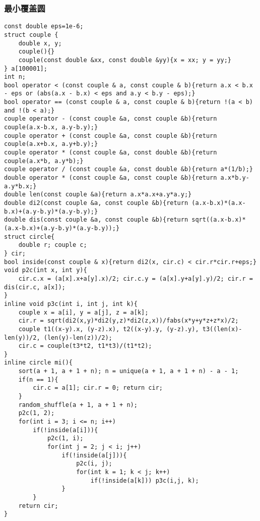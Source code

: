 \documentclass[landscape,a4paper]{article}
\begin{document}
\begin{spacing}{0.3}
\begin{multicols}{3}
\subsubsection{最小覆盖圆}
\begin{lstlisting}
const double eps=1e-6;
struct couple {
	double x, y;
	couple(){}
	couple(const double &xx, const double &yy){x = xx; y = yy;}
} a[100001];
int n;
bool operator < (const couple & a, const couple & b){return a.x < b.x - eps or (abs(a.x - b.x) < eps and a.y < b.y - eps);}
bool operator == (const couple & a, const couple & b){return !(a < b) and !(b < a);}
couple operator - (const couple &a, const couple &b){return couple(a.x-b.x, a.y-b.y);}
couple operator + (const couple &a, const couple &b){return couple(a.x+b.x, a.y+b.y);}
couple operator * (const couple &a, const double &b){return couple(a.x*b, a.y*b);}
couple operator / (const couple &a, const double &b){return a*(1/b);}
double operator * (const couple &a, const couple &b){return a.x*b.y-a.y*b.x;}
double len(const couple &a){return a.x*a.x+a.y*a.y;}
double di2(const couple &a, const couple &b){return (a.x-b.x)*(a.x-b.x)+(a.y-b.y)*(a.y-b.y);}
double dis(const couple &a, const couple &b){return sqrt((a.x-b.x)*(a.x-b.x)+(a.y-b.y)*(a.y-b.y));}
struct circle{
	double r; couple c;
} cir;
bool inside(const couple & x){return di2(x, cir.c) < cir.r*cir.r+eps;}
void p2c(int x, int y){
	cir.c.x = (a[x].x+a[y].x)/2; cir.c.y = (a[x].y+a[y].y)/2; cir.r = dis(cir.c, a[x]);
}
inline void p3c(int i, int j, int k){
	couple x = a[i], y = a[j], z = a[k];
	cir.r = sqrt(di2(x,y)*di2(y,z)*di2(z,x))/fabs(x*y+y*z+z*x)/2;
	couple t1((x-y).x, (y-z).x), t2((x-y).y, (y-z).y), t3((len(x)-len(y))/2, (len(y)-len(z))/2);
	cir.c = couple(t3*t2, t1*t3)/(t1*t2);
}
inline circle mi(){
	sort(a + 1, a + 1 + n); n = unique(a + 1, a + 1 + n) - a - 1;
	if(n == 1){
		cir.c = a[1]; cir.r = 0; return cir;
	}
	random_shuffle(a + 1, a + 1 + n);
	p2c(1, 2);
	for(int i = 3; i <= n; i++)
		if(!inside(a[i])){
			p2c(1, i);
			for(int j = 2; j < i; j++)
				if(!inside(a[j])){
					p2c(i, j);
					for(int k = 1; k < j; k++)
						if(!inside(a[k])) p3c(i,j, k);
				}
		}
	return cir;
}
\end{lstlisting}

\end{multicols}
\end{spacing}
\end{document}
